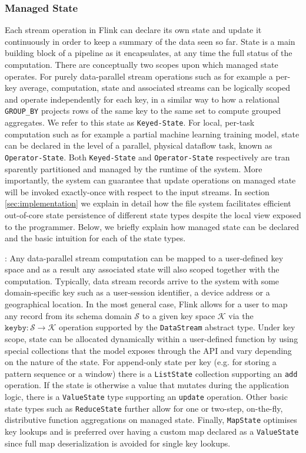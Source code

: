 \subsubsection{Managed State}
\label{sec:managedstate}
Each stream operation in Flink can declare its own state and update it continuously in order to keep a summary of the data seen so far. State is a main building block of a pipeline as it encapsulates, at any time the full status of the computation. There are conceptually two scopes upon which managed state operates. For purely data-parallel stream operations such as for example a per-key average, computation, state and associated streams can be logically scoped and operate independently for each key, in a similar way to how a relational \texttt{GROUP\_BY} projects rows of the same key to the same set to compute grouped aggregates. We refer to this state as \texttt{Keyed-State}.
For local, per-task computation such as for example a partial machine learning training model, state can be declared in the level of a parallel, physical dataflow task, known as \texttt{Operator-State}. Both \texttt{Keyed-State} and \texttt{Operator-State} respectively are tran sparently partitioned and managed by the runtime of the system. More importantly, the system can guarantee that update operations on managed state will be invoked exactly-once with respect to the input streams. In section \ref{sec:implementation} we explain in detail how the file system facilitates efficient out-of-core state persistence of different state types despite the local  view exposed to the programmer. Below, we briefly explain how managed state can be declared and the basic intuition for each of the state types. 

: Any data-parallel stream computation can be mapped to a user-defined key space and as a result any associated state will also scoped together with the computation. Typically, data stream records arrive to the system with some domain-specific key such as a user-session identifier, a device address or a geographical location. In the most general case, Flink allows for a user to map any record from its schema domain $\mathcal{S}$ to a given key space $\mathcal{K}$ via the $\texttt{keyby}: \mathcal{S} \rightarrow \mathcal{K}$ operation supported by the \texttt{DataStream} abstract type. Under key scope, state can be allocated dynamically within a user-defined function by using special collections that the model exposes through the API and vary depending on the nature of the state. For append-only state per key (e.g. for storing a pattern sequence or a window) there is a \texttt{ListState} collection supporting an \texttt{add} operation. If  the state is otherwise a value that mutates during the application logic, there is a \texttt{ValueState} type supporting an \texttt{update} operation. Other basic state types such as \texttt{ReduceState} further allow for one or two-step, on-the-fly, distributive function aggregations on managed state. Finally, \texttt{MapState} optimises key lookups and is preferred over having a custom map declared as a \texttt{ValueState} since full map deserialization is avoided for single key lookups.

